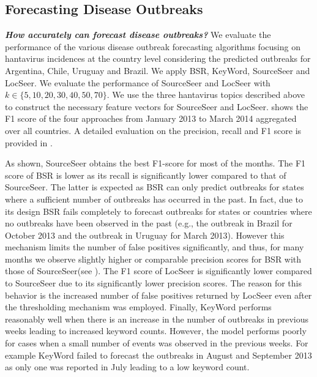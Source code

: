 \documentclass[twoside,leqno,twocolumn]{article}
\newcommand{\fullmodel}{{{\sf SourceSeer}}\xspace}
\newcommand{\locationmodel}{{\sf LocSeer}\xspace}
\newcommand{\keymodel}{{\sf KeyWord}\xspace}
\begin{document}
\subsection{Forecasting Disease Outbreaks} \textbf{{\em How accurately can {} forecast disease outbreaks?}} We evaluate the performance of the various disease outbreak forecasting algorithms focusing on hantavirus incidences at the country level considering the predicted outbreaks for Argentina, Chile, Uruguay and Brazil.  We apply BSR,  \keymodel, \fullmodel and \locationmodel. We evaluate the performance of \fullmodel and \locationmodel with $k \in \{5,10,20,30,40,50,70\}$. We use the three hantavirus topics described above to construct the necessary feature vectors for \fullmodel and \locationmodel.   shows the F1 score  of the four approaches from January 2013 to March 2014 aggregated over all countries. A detailed evaluation on the precision, recall and F1 score is provided in .

As shown, \fullmodel  obtains the best F1-score for most of the months. The F1 score of BSR is lower as its recall is significantly lower compared to that of \fullmodel. The latter is expected as BSR can only predict outbreaks for states where a sufficient number of outbreaks has occurred in the past. In fact, due to its design BSR fails completely to forecast outbreaks for states or countries where no outbreaks have been observed in the past (e.g., the outbreak in Brazil for October 2013 and the outbreak in Uruguay for March 2013).  However this mechanism limits the number of false positives significantly, and thus, for many months we observe slightly higher or comparable precision scores for BSR with those of \fullmodel (see ). The F1 score of \locationmodel is significantly lower compared to \fullmodel due to its significantly lower precision scores. The reason for this behavior is the increased number of false positives returned by \locationmodel even after the thresholding mechanism was employed. 
Finally,  \keymodel performs reasonably well when there is an increase in the number of outbreaks in previous weeks leading to increased keyword counts. However, the model performs poorly for cases when a small number of events was observed in the previous weeks. For example \keymodel failed to forecast the outbreaks in August  and September 2013 as only one was reported in July leading to a low keyword count. 
\end{document}
